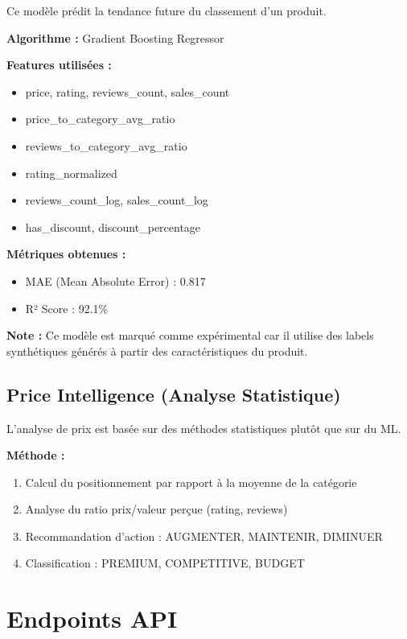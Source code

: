 \documentclass[12pt,a4paper]{report}
\begin{document}
Ce modèle prédit la tendance future du classement d'un produit.

\textbf{Algorithme :} Gradient Boosting Regressor

\textbf{Features utilisées :}
\begin{itemize}[noitemsep]
    \item price, rating, reviews\_count, sales\_count
    \item price\_to\_category\_avg\_ratio
    \item reviews\_to\_category\_avg\_ratio
    \item rating\_normalized
    \item reviews\_count\_log, sales\_count\_log
    \item has\_discount, discount\_percentage
\end{itemize}

\textbf{Métriques obtenues :}
\begin{itemize}[noitemsep]
    \item MAE (Mean Absolute Error) : 0.817
    \item R² Score : 92.1\%
\end{itemize}

\textbf{Note :} Ce modèle est marqué comme expérimental car il utilise des labels synthétiques générés à partir des caractéristiques du produit.

\subsection{Price Intelligence (Analyse Statistique)}

L'analyse de prix est basée sur des méthodes statistiques plutôt que sur du ML.

\textbf{Méthode :}
\begin{enumerate}[noitemsep]
    \item Calcul du positionnement par rapport à la moyenne de la catégorie
    \item Analyse du ratio prix/valeur perçue (rating, reviews)
    \item Recommandation d'action : AUGMENTER, MAINTENIR, DIMINUER
    \item Classification : PREMIUM, COMPETITIVE, BUDGET
\end{enumerate}

\section{Endpoints API}
\end{document}
